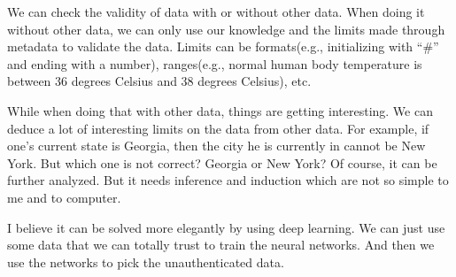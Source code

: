 \documentclass[12pt, a4paper]{article}
\begin{document}
We can check the validity of data with or without other data. When doing it without other data, we can only use our knowledge and the limits made through metadata to validate the data. Limits can be formats(e.g., initializing with ``\#'' and ending with a number), ranges(e.g., normal human body temperature is between 36 degrees Celsius and 38 degrees Celsius), etc.

While when doing that with other data, things are getting interesting. We can deduce a lot of interesting limits on the data from other data. For example, if one's current state is Georgia, then the city he is currently in cannot be New York. But which one is not correct? Georgia or New York? Of course, it can be further analyzed. But it needs inference and induction which are not so simple to me and to computer.

I believe it can be solved more elegantly by using deep learning. We can just use some data that we can totally trust to train the neural networks. And then we use the networks to pick the unauthenticated data.

\end{document}
